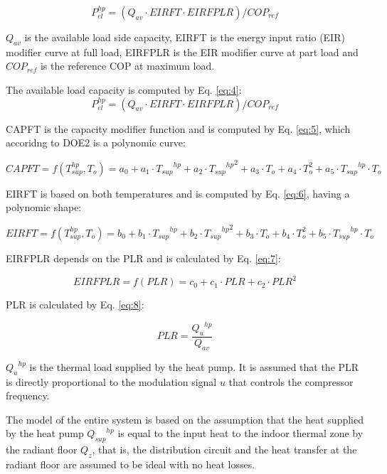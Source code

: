 \begin{equation}
P_{el}^{hp} = (Q_{av} \cdot EIRFT \cdot EIRFPLR)/COP_{ref}
\label{eq:3}
\end{equation}

$Q_{av}$ is the available load side capacity, EIRFT is the energy input ratio (EIR) modifier curve at full load, EIRFPLR is the EIR modifier curve at part load and $COP_{ref}$ is the reference COP at maximum load. 

The available load capacity is computed by Eq. \ref{eq:4}:
\begin{equation}
P_{el}^{hp} = (Q_{av} \cdot EIRFT \cdot EIRFPLR)/COP_{ref}
\label{eq:4}
\end{equation}

CAPFT is the capacity modifier function and is computed by Eq. \ref{eq:5}, which accoridng to DOE2 is a polynomic curve:

\begin{equation}
CAPFT = f(T_{sup}^{hp},T_{o}) = a_0 + a_1 \cdot {T_{sup}}^{hp} + a_2 \cdot {{T_{sup}}^{hp}}^2 + a_3 \cdot T_{o} + a_4 \cdot T_{o}^2 + a_5 \cdot {T_{sup}}^{hp} \cdot T_o
\label{eq:5}
\end{equation}

EIRFT is based on both temperatures and is computed by Eq. \ref{eq:6}, having a polynomic shape:

\begin{equation}
EIRFT = f(T_{sup}^{hp},T_{o}) = b_0 + b_1 \cdot {T_{sup}}^{hp} + b_2 \cdot {{T_{sup}}^{hp}}^2 + b_3 \cdot T_{o} + b_4 \cdot T_{o}^2 + b_5 \cdot {T_{sup}}^{hp} \cdot T_o
\label{eq:6}
\end{equation}

EIRFPLR depends on the PLR and is calculated by Eq. \ref{eq:7}:

\begin{equation}
EIRFPLR = f(PLR) = c_0 + c_1 \cdot PLR + c_2 \cdot PLR^2
\label{eq:7}
\end{equation}

PLR is calculated by Eq. \ref{eq:8}:

\begin{equation}
PLR = \frac{{Q_{u}}^{hp}}{Q_{av}}
\label{eq:8}
\end{equation}

${Q_{u}}^{hp}$ is the thermal load supplied by the heat pump. It is assumed that the PLR is directly proportional to the modulation signal $u$ that controls the compressor frequency.  

The model of the entire system is based on the assumption that the heat supplied by the heat pump ${Q_{sup}}^{hp}$ is equal to the input heat to the indoor thermal zone by the radiant floor $Q_z$, that is, the distribution circuit and the heat transfer at the radiant floor are assumed to be ideal with no heat losses.

